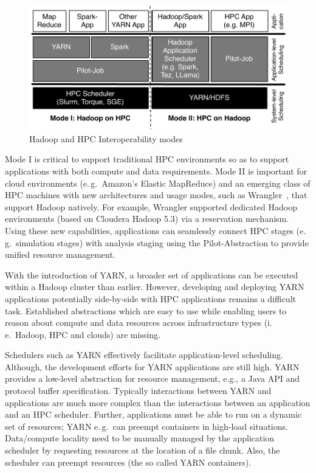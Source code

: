 \begin{figure}[t]
    \centering
    \includegraphics[width=.85\textwidth]{figures/data_analytics_hpc/hpc_hadoop/hadoop-on-hpc-viceverse.pdf}
    \caption{Hadoop and HPC Interoperability modes\label{fig:figures_hadoop-on-hpc-viceverse}}
\end{figure}

Mode I is critical to support traditional HPC environments so as to support applications with both compute and data requirements.
Mode II is important for cloud environments (e.\,g.\ Amazon's Elastic MapReduce) and an emerging class of HPC machines with new architectures and usage modes, such as Wrangler~\cite{wrangler}, that support Hadoop natively.
For example, Wrangler supported dedicated Hadoop environments (based on Cloudera Hadoop 5.3) via a reservation mechanism.
Using these new capabilities, applications can seamlessly connect HPC stages (e.\,g.\ simulation stages) with analysis staging using the Pilot-Abstraction to provide unified resource management.

With the introduction of YARN, a broader set of applications can be executed within a Hadoop cluster than earlier.
However, developing and deploying YARN applications potentially side-by-side with HPC applications remains a difficult task.
Established abstractions which are easy to use while enabling users to reason about compute and data resources across infrastructure types (i.\,e.\ Hadoop, HPC and clouds) are missing. 

Schedulers such as YARN effectively facilitate application-level scheduling.
Although, the development efforts for YARN applications are still high.
YARN provides a low-level abstraction for resource management, e.g., a Java API and protocol buffer specification.
Typically interactions between YARN and applications are much more complex than the interactions between an application and an HPC scheduler.
Further, applications must be able to run on a dynamic set of resources; YARN e.\,g.\ can preempt containers in high-load situations.
Data/compute locality need to be manually managed by the application scheduler by requesting resources at the location of a file chunk.
Also, the scheduler can preempt resources (the so called YARN containers).

